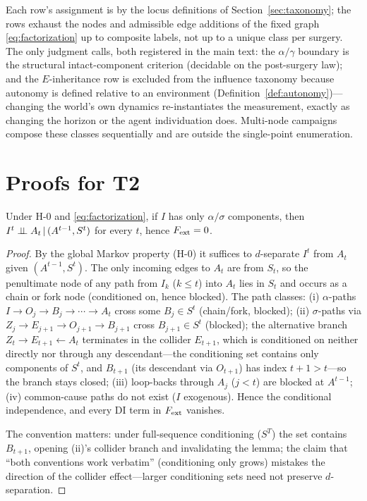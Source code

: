 \noindent Each row's assignment is by the locus definitions of
Section~\ref{sec:taxonomy}; the rows exhaust the nodes and admissible edge
additions of the fixed graph \eqref{eq:factorization} up to composite
labels, not up to a unique class per surgery. The only judgment
calls, both registered in the main text: the $\alpha/\gamma$ boundary is the
structural intact-component criterion (decidable on the post-surgery law);
and the $E$-inheritance row is excluded from the influence taxonomy because
autonomy is defined relative to an environment
(Definition~\ref{def:autonomy})---changing the world's own dynamics
re-instantiates the measurement, exactly as changing the horizon or the
agent individuation does. Multi-node campaigns compose these classes
sequentially and are outside the single-point enumeration.

\section{Proofs for T2}\label{app:t2}

\begin{lemma}
Under \textup{H-0} and \eqref{eq:factorization}, if $I$ has only
$\alpha/\sigma$ components, then $I^t\perp\!\!\!\perp A_t\,|\,(A^{t-1},S^t)$ for every
$t$, hence $F_{\mathrm{ext}}=0$.
\end{lemma}
\begin{proof}
By the global Markov property (H-0) it suffices to $d$-separate $I^t$ from
$A_t$ given $(A^{t-1},S^t)$. The only incoming edges to $A_t$ are from $S_t$,
so the penultimate node of any path from $I_k$ ($k\le t$) into $A_t$ lies in
$S_t$ and occurs as a chain or fork node (conditioned on, hence blocked). The
path classes: (i) $\alpha$-paths $I\to O_j\to B_j\to\cdots\to A_t$ cross some
$B_j\in S^t$ (chain/fork, blocked); (ii) $\sigma$-paths via $Z_j\to
E_{j+1}\to O_{j+1}\to B_{j+1}$ cross $B_{j+1}\in S^t$ (blocked); the
alternative branch $Z_t\to E_{t+1}\leftarrow A_t$ terminates in the collider
$E_{t+1}$, which is conditioned on neither directly nor through any
descendant---the conditioning set contains only components of $S^t$, and
$B_{t+1}$ (its descendant via $O_{t+1}$) has index $t+1>t$---so the branch
stays closed; (iii) loop-backs through $A_j$ ($j<t$) are blocked at
$A^{t-1}$; (iv) common-cause paths do not exist ($I$ exogenous). Hence the
conditional independence, and every DI term in $F_{\mathrm{ext}}$ vanishes.

The convention matters: under full-sequence conditioning ($S^T$) the set
contains $B_{t+1}$, opening (ii)'s collider branch and invalidating the
lemma; the claim that ``both conventions work verbatim'' (conditioning only
grows) mistakes the direction of the collider effect---larger conditioning
sets need not preserve $d$-separation.
\end{proof}

